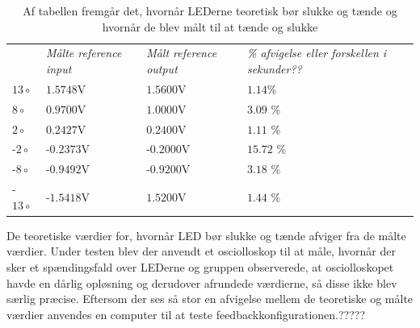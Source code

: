\begin{table}[H]
\centering
\begin{tabular}{llll}
           & \textit{Målte reference input} & \textit{Målt reference output} & \textit{\% afvigelse eller forskellen i sekunder??} \\
$13\circ$  & $1.5748$V                      & $1.5600$V                      & $1.14$\%                                            \\
$8\circ$   & $0.9700$V                      & $1.0000$V                      & $3.09$ \%                                           \\
$2\circ$   & $0.2427$V                      & $0.2400$V                      & $1.11$ \%                                           \\
-$2\circ$  & -$0.2373$V                     & -$0.2000$V                     & $15.72$ \%                                          \\
-$8\circ$  & -$0.9492$V                     & -$0.9200$V                     & $3.18$ \%                                           \\
-$13\circ$ & -$1.5418$V                     & $1.5200$V                      & $1.44$ \%                                          
\end{tabular}
\caption{Af tabellen fremgår det, hvornår LEDerne teoretisk bør slukke og tænde og hvornår de blev målt til at tænde og slukke}
\label{Tab:test-taendsluk}
\end{table}

De teoretiske værdier for, hvornår LED bør slukke og tænde afviger fra de målte værdier. Under testen blev der anvendt et osciolloskop til at måle, hvornår der sker et spændingsfald over LEDerne og gruppen observerede, at osciolloskopet havde en dårlig opløsning og derudover afrundede værdierne, så disse ikke blev særlig præcise. Eftersom der ses så stor en afvigelse mellem de teoretiske og målte værdier anvendes en computer til at teste feedbackkonfigurationen.????? 
